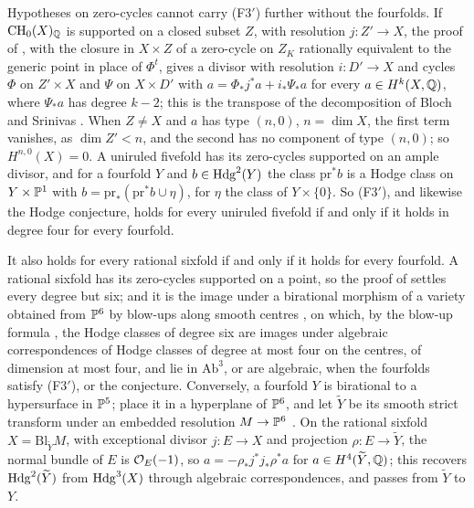 \begin{remark}\label{rem:f3primesharp}
Hypotheses on zero-cycles cannot carry \textup{(F3$'$)} further without the
fourfolds. If $\mathrm{CH}_{0}(X)_{\mathbb{Q}}$ is supported on a closed subset $Z$,
with resolution $j\colon Z'\to X$, the proof of ,
with the closure in $X\times Z$ of a zero-cycle on $Z_{K}$ rationally
equivalent to the generic point in place of $\Phi^{t}$, gives a divisor with
resolution $i\colon D'\to X$ and cycles $\Phi$ on $Z'\times X$ and $\Psi$ on
$X\times D'$ with $a=\Phi_{*}j^{*}a+i_{*}\Psi_{*}a$ for every
$a\in H^{k}(X,\mathbb{Q})$, where $\Psi_{*}a$ has degree $k-2$; this is the
transpose of the decomposition of Bloch and Srinivas \cite{BS83}. When
$Z\ne X$ and $a$ has type $(n,0)$, $n=\dim X$, the first term vanishes, as
$\dim Z'<n$, and the second has no component of type $(n,0)$; so
$H^{n,0}(X)=0$. A uniruled fivefold has its zero-cycles
supported on an ample divisor, and for a fourfold $Y$ and
$b\in\mathrm{Hdg}^{2}(Y)$ the class $\mathrm{pr}^{*}b$ is a Hodge class on
$Y\times\mathbb{P}^{1}$ with $b=\mathrm{pr}_{*}(\mathrm{pr}^{*}b\cup\eta)$, for
$\eta$ the class of $Y\times\{0\}$. So \textup{(F3$'$)}, and likewise the
Hodge conjecture, holds for every uniruled fivefold if and only if it holds
in degree four for every fourfold.

It also holds for every rational sixfold if and only if it holds for every
fourfold. A rational sixfold has its zero-cycles supported on a point, so
the proof of  settles every degree but six; and it
is the image under a birational morphism of a variety obtained from
$\mathbb{P}^{6}$ by blow-ups along smooth centres \cite{Hir64}, on which, by the
blow-up formula \cite[\S7.3.3]{Voi02}, the Hodge classes of degree six are
images under algebraic correspondences of Hodge classes of degree at most
four on the centres, of dimension at most four, and lie in
$\mathrm{Ab}^{3}$, or are algebraic, when the fourfolds satisfy
\textup{(F3$'$)}, or the conjecture. Conversely, a fourfold $Y$
is birational to a hypersurface in $\mathbb{P}^{5}$; place it in a hyperplane of
$\mathbb{P}^{6}$, and let $\widetilde Y$ be its smooth strict transform under an
embedded resolution $M\to\mathbb{P}^{6}$ \cite{Hir64}. On the rational sixfold
$X=\mathrm{Bl}_{\widetilde Y}M$, with exceptional divisor $j\colon E\to X$
and projection $\rho\colon E\to\widetilde Y$, the normal bundle of $E$ is
$\mathcal{O}_{E}(-1)$, so $a=-\rho_{*}j^{*}j_{*}\rho^{*}a$ for
$a\in H^{4}(\widetilde Y,\mathbb{Q})$; this recovers $\mathrm{Hdg}^{2}(\widetilde Y)$ from
$\mathrm{Hdg}^{3}(X)$ through algebraic correspondences, and
 passes from $\widetilde Y$ to $Y$.


\end{remark}

